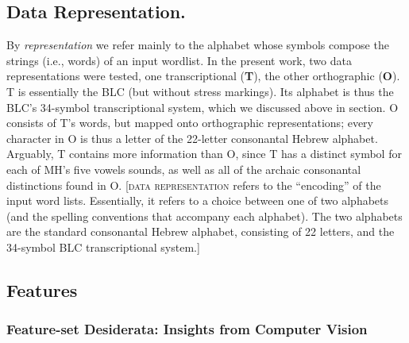 \subsection {Data Representation.} 
\label{sec:datarep}
By \emph{representation} we refer mainly to the alphabet whose 
symbols compose the strings (i.e., words) 
of an input wordlist.
In the present work, two data representations were tested, one transcriptional 
(\textbf{T}), the other orthographic (\textbf{O}). 
T is essentially the \ac{BLC} (but without stress markings). 
Its alphabet is thus the \ac{BLC}'s 34-symbol
transcriptional system, which we discussed above in section.
O consists of T's words, but mapped onto orthographic 
representations; every character in O is thus
a letter of the 22-letter consonantal Hebrew alphabet.
Arguably, T contains more information than O,
since T has a distinct symbol for each of \ac{MH}'s five vowels sounds,
as well as all of the archaic consonantal distinctions found in O. 
[\textsc{data representation} refers to the ``encoding'' of the input
word lists. Essentially, it refers to a choice between one of two alphabets (and the spelling conventions that 
accompany each alphabet). The two alphabets are the standard consonantal Hebrew alphabet, consisting of 22 letters,
and the 34-symbol \ac{BLC} transcriptional system.]

\subsection{Features}   %
\label{sec:features}

\subsubsection{Feature-set Desiderata: Insights from Computer Vision}
